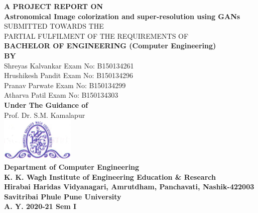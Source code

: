 \documentclass[oneside,a4paper,12pt]{report}
\begin{document}
\setlength{\parindent}{0mm}
\begin{center}
{\bfseries A  PROJECT REPORT ON \\}
 \vspace*{2\baselineskip}
{\bfseries \fontsize{16}{12} \selectfont Astronomical Image colorization and super-resolution using GANs \\ \vspace*{2\baselineskip}}
{\fontsize{12}{12} \selectfont SUBMITTED TOWARDS THE
 \\PARTIAL FULFILMENT OF THE REQUIREMENTS OF \\

\vspace*{2\baselineskip}}
{\bfseries \fontsize{14}{12} \selectfont BACHELOR OF ENGINEERING (Computer
Engineering) \\
\vspace*{1\baselineskip}}
{\bfseries \fontsize{14}{12} \selectfont BY \\
\vspace*{1\baselineskip}}
Shreyas Kalvankar  \hspace{25 mm} Exam No: B150134261 \\
Hrushikesh Pandit \hspace{25 mm} Exam No: B150134296  \\
Pranav Parwate \hspace{30 mm} Exam No: B150134299 \\
Atharva Patil \hspace{34 mm} Exam No: B150134303\\
\vspace*{2\baselineskip}
{\bfseries \fontsize{14}{12} \selectfont Under The Guidance of \\
\vspace*{2\baselineskip}}
Prof. Dr. S.M. Kamalapur\\
\includegraphics[width=100pt]{collegelogo.png} \\
{\bfseries \fontsize{14}{12} \selectfont Department of Computer Engineering \\
K. K. Wagh Institute of Engineering Education \& Research \\
Hirabai Haridas Vidyanagari, Amrutdham, Panchavati, Nashik-422003 \\
Savitribai Phule Pune University\\
A. Y. 2020-21 Sem I
}
\end{center}
\end{document}
